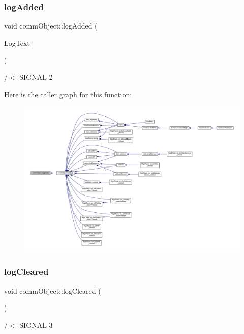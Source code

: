 \subsubsection{log\+Added}
{\footnotesize\ttfamily void comm\+Object\+::log\+Added (\begin{DoxyParamCaption}\item[{Q\+String}]{Log\+Text }\end{DoxyParamCaption})\hspace{0.3cm}{\ttfamily [signal]}}



/$<$ S\+I\+G\+N\+AL 2 

Here is the caller graph for this function\+:\nopagebreak
\begin{figure}[H]
\begin{center}
\leavevmode
\includegraphics[width=350pt]{classcomm_object_a72620fe1bac16309baf6d148644edaf9_icgraph}
\end{center}
\end{figure}
\mbox{\label{classcomm_object_af2304085624c26230e9d930d616e3e19}} 
\subsubsection{log\+Cleared}
{\footnotesize\ttfamily void comm\+Object\+::log\+Cleared (\begin{DoxyParamCaption}{ }\end{DoxyParamCaption})\hspace{0.3cm}{\ttfamily [signal]}}



/$<$ S\+I\+G\+N\+AL 3 


